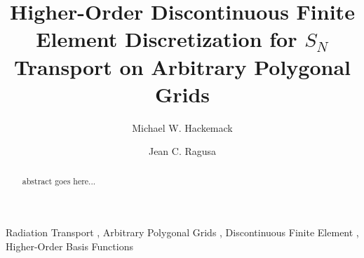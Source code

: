 \documentclass[preprint,10pt]{elsarticle}
\begin{document}
 

\begin{frontmatter}



\title{Higher-Order Discontinuous Finite Element Discretization for $S_N$ Transport on Arbitrary Polygonal Grids}


\author{Michael W. Hackemack}
\author{Jean C. Ragusa}
\address{Department of Nuclear Engineering, Texas A\&M University, College Station, TX 77843, USA}


\begin{abstract}

abstract goes here...
 

\end{abstract}

\begin{keyword}
  Radiation Transport \sep
	Arbitrary Polygonal Grids \sep
  Discontinuous Finite Element \sep
	Higher-Order Basis Functions
\end{keyword}

\end{frontmatter}
\end{document}

